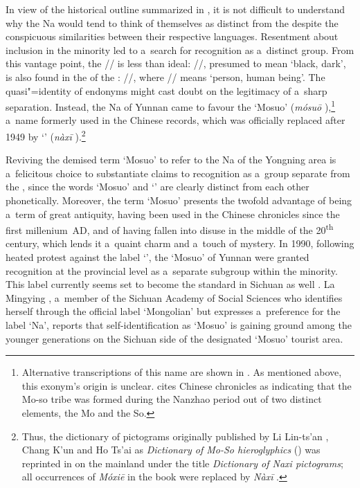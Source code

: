 In view of the historical outline summarized in , it is not difficult to understand why the Na would tend to think of themselves as distinct from the  despite the conspicuous similarities between their respective languages. Resentment about inclusion in the  minority led to a~search for recognition as a~distinct group. From this vantage point, the  // is less than ideal: //, presumed to mean ‘black, dark’, is also found in the  of the : //, where // means ‘person, human being’. The quasi"=identity of endonyms might cast doubt on the legitimacy of a~sharp separation. Instead, the Na of Yunnan came to favour the  ‘Mosuo’ (\textit{mósuō} ),\footnote{Alternative transcriptions of this name are shown in . As mentioned above, this {exonym}'s origin is unclear. \citet[132]{chavannes1912} cites Chinese chronicles as indicating that the Mo-so tribe was formed during the Nanzhao period out of two distinct elements, the Mo and the So.} a~name formerly used in the Chinese records, which was officially replaced after 1949 by ‘' (\textit{nàxī} ).\footnote{Thus, the dictionary of pictograms originally published by Li Lin-ts’an , Chang K’un  and Ho Ts’ai  as 
	\textit{Dictionary of Mo-So hieroglyphics} (\citeyear{lietal1953}) was reprinted in \citeyear{lietal2001} on the mainland under the title \textit{Dictionary of {Naxi} pictograms}; all occurrences of \textit{Móxiē}  in the book were replaced by \textit{Nàxī} .}

Reviving the demised term ‘Mosuo’ to refer to the Na of the Yongning area is a~felicitous choice to substantiate claims to recognition as a~group separate from the , since the words ‘Mosuo’ and ‘’ are clearly distinct from each other phonetically. Moreover, the term ‘Mosuo’ presents the twofold advantage of being a~term of great antiquity, having been used in the Chinese chronicles since the first millenium \,AD, and of having fallen into disuse in the middle of the 20\textsuperscript{th} century, which lends it a~quaint charm and a~touch of mystery. In 1990, following heated protest against the label ‘’, the ‘Mosuo’ of Yunnan were granted recognition at the provincial level as a~separate subgroup within the  minority. This label currently seems set to become the standard in Sichuan as well \citep[10-11]{lidazhu2015}. La Mingying , a~member of the Sichuan Academy of Social Sciences who identifies herself through the official label ‘Mongolian’ but expresses a~preference for the label ‘Na’, reports that self-identification as ‘Mosuo’ is gaining ground among the younger generations on the Sichuan side of the designated ‘Mosuo’ tourist area. 

